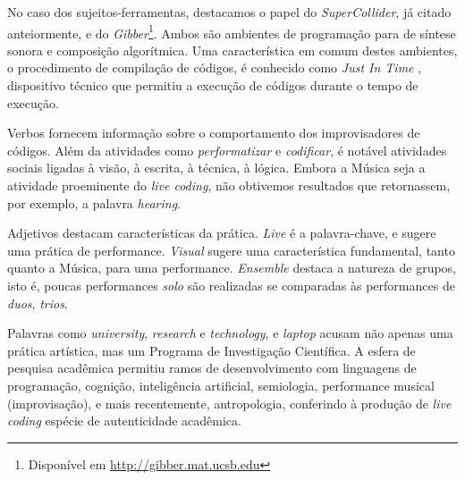 No caso dos sujeitos-ferramentas, destacamos o papel do \emph{SuperCollider}, já citado anteiormente, e do \emph{Gibber}\cite{roberts_gibber:_2012,wyse_viability_2014}\footnote{Disponível em \url{http://gibber.mat.ucsb.edu}}. Ambos são ambientes de programação para de síntese sonora e composição algorítmica. Uma característica em comum destes ambientes, o procedimento de compilação de códigos, é conhecido como \emph{Just In Time} \cite{aycock_brief_2003}, dispositivo técnico que permitiu a execução de códigos durante o tempo de execução.

Verbos fornecem informação sobre o comportamento dos improvisadores de códigos. Além da atividades como \emph{performatizar} e \emph{codificar}, é notável atividades sociais ligadas à visão, à escrita, à técnica, à lógica. Embora a Música seja a atividade proeminente do \emph{live coding}, não obtivemos resultados que retornassem, por exemplo, a palavra \emph{hearing}. 

Adjetivos destacam características da prática. \emph{Live} é a palavra-chave, e sugere uma prática de performance. \emph{Visual} sugere uma característica fundamental, tanto quanto a Música, para uma performance. \emph{Ensemble} destaca a natureza de grupos, isto é, poucas performances \emph{solo} são realizadas se comparadas às performances de \emph{duos}, \emph{trios}. 

Palavras como \emph{university}, \emph{research} e \emph{technology}, e \emph{laptop} acusam não apenas uma prática artística, mas um Programa de Investigação Científica. A esfera de pesquisa acadêmica permitiu ramos de desenvolvimento com linguagens de programação, cognição, inteligência artificial, semiologia, performance musical (improvisação), e mais recentemente, antropologia, conferindo à produção de \emph{live coding} espécie de autenticidade acadêmica.